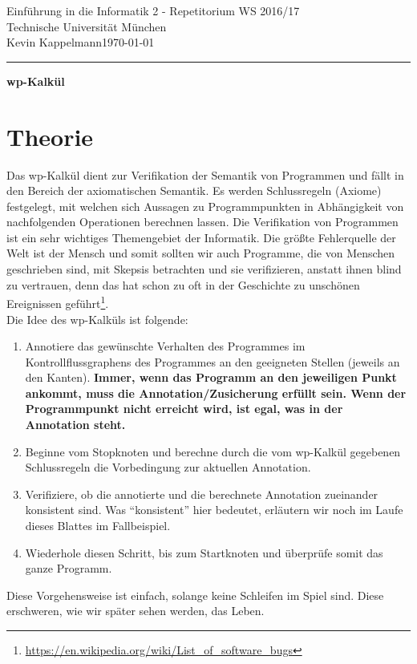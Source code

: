 \documentclass[hidelinks]{article}
\theoremstyle{plain}
\theoremstyle{definition}
\theoremstyle{rem}
\begin{document}

\begin{sloppypar}
\begingroup  
  \LARGE Einführung in die Informatik 2 - Repetitorium WS 2016/17\\Technische Universität München\\[0.5em]
  \large{Kevin Kappelmann\hfill \today}\\
\endgroup
\hrule height 1pt
{\LARGE{{\begin{center}\textbf{wp-Kalkül}\end{center}}}}
\section{Theorie}
Das wp-Kalkül dient zur Verifikation der Semantik von Programmen und fällt in den Bereich der axiomatischen Semantik. Es werden Schlussregeln (Axiome) festgelegt, mit welchen sich Aussagen zu Programmpunkten in Abhängigkeit von nachfolgenden Operationen berechnen lassen.
	Die Verifikation von Programmen ist ein sehr wichtiges Themengebiet der Informatik. Die größte Fehlerquelle der Welt ist der Mensch und somit sollten wir auch Programme, die von Menschen geschrieben sind, mit Skepsis betrachten und sie verifizieren, anstatt ihnen blind zu vertrauen, denn das hat schon zu oft in der Geschichte zu unschönen Ereignissen geführt\footnote{\url{https://en.wikipedia.org/wiki/List\_of\_software\_bugs}}.\\
Die Idee des wp-Kalküls ist folgende:
\begin{enumerate}
\item Annotiere das gewünschte Verhalten des Programmes im Kontrollflussgraphens des Programmes an den geeigneten Stellen (jeweils an den Kanten). \textbf{Immer, wenn das Programm an den jeweiligen Punkt ankommt, muss die Annotation/Zusicherung erfüllt sein. Wenn der Programmpunkt nicht erreicht wird, ist egal, was in der Annotation steht.}
\item Beginne vom Stopknoten und berechne durch die vom wp-Kalkül gegebenen Schlussregeln die Vorbedingung zur aktuellen Annotation.
\item Verifiziere, ob die annotierte und die berechnete Annotation zueinander konsistent sind. Was ``konsistent'' hier bedeutet, erläutern wir noch im Laufe dieses Blattes im Fallbeispiel.
\item Wiederhole diesen Schritt, bis zum Startknoten und überprüfe somit das ganze Programm.
\end{enumerate}
Diese Vorgehensweise ist einfach, solange keine Schleifen im Spiel sind. Diese erschweren, wie wir später sehen werden, das Leben.

\end{sloppypar}
\end{document}
